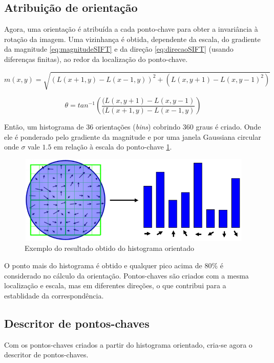\subsection{Atribuição de orientação}

Agora, uma orientação é atribuída a cada ponto-chave para obter a invariância à rotação da imagem. 
Uma vizinhança é obtida, dependente da escala, do gradiente da magnitude \ref{eq:magnitudeSIFT} e da direção \ref{eq:direcaoSIFT} (usando diferenças finitas), ao redor da localização do ponto-chave. 

\begin{equation}
	m(x,y) = \sqrt{(L(x+1,y)-L(x-1,y))^2 + (L(x,y+1)-L(x,y-1)^2)}
	\label{eq:magnitudeSIFT}
\end{equation}

\begin{equation}
	\theta = tan^{-1} \left( \frac{(L(x,y+1)-L(x,y-1)}{(L(x+1,y)-L(x-1,y)}\right)
	\label{eq:direcaoSIFT}
\end{equation}

Então, um histograma de 36 orientações ({\it bins}) cobrindo 360 graus é criado. Onde ele é ponderado pelo gradiente da magnitude e por uma janela Gaussiana circular onde $\sigma$ vale $1.5$ em relação à escala do ponto-chave \ref{fig:histogramaOrientado}.

\begin{figure} [!h]
	\centering
	\includegraphics[width=0.45\linewidth]{figs/histogramaOrientado.png}
	\caption{%
	Exemplo do resultado obtido do histograma orientado
	}\label{fig:histogramaOrientado}
\end{figure}

O ponto mais do histograma é obtido e qualquer pico acima de 80\% é considerado no cálculo da orientação. 
Pontos-chaves são criados com a mesma localização e escala, mas em diferentes direções, o que contribui para a establidade da correspondência.

\subsection{Descritor de pontos-chaves}

Com os pontos-chaves criados a partir do histograma orientado, cria-se agora o descritor de pontos-chaves.

